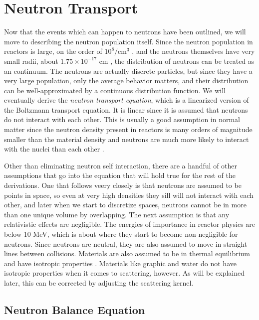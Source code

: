 \section{Neutron Transport}

Now that the events which can happen to neutrons have been outlined, we will move to describing the neutron population itself.  Since the neutron population in reactors is large, on the order of $10^{8}/\mathrm{cm}^3$ \cite{duderstadt}, and the neutrons themselves have very small radii, about $1.75\times10^{-17}$ cm \cite{krane}, the distribution of neutrons can be treated as an continuum.  The neutrons are actually discrete particles, but since they have a very large population, only the average behavior matters, and their distribution can be well-approximated by a continuous distribution function.  We will eventually derive the \emph{neutron transport equation}, which is a linearized version of the Boltzmann transport equation.  It is linear since it is assumed that neutrons do not interact with each other.  This is usually a good assumption in normal matter since the neutron density present in reactors is many orders of magnitude smaller than the material density and neutrons are much more likely to interact with the nuclei than each other \cite{duderstadt}.  

Other than eliminating neutron self interaction, there are a handful of other assumptions that go into the equation that will hold true for the rest of the derivations.  One that follows veery closely is that neutrons are assumed to be points in space, so even at very high densities they sill will not interact with each other, and later when we start to discretize spaces, neutrons cannot be in more than one unique volume by overlapping.  The next assumption is that any relativistic effects are negligible.  The energies of importance in reactor physics are below 10 MeV, which is about where they start to become non-negligible for neutrons.  Since neutrons are neutral, they are also assumed to move in straight lines between collisions.  Materials are also assumed to be in thermal equilibrium and have isotropic properties \cite{duderstadt}.  Materials like graphic and water do not have isotropic properties when it comes to scattering, however.  As will be explained later, this can be corrected by adjusting the scattering kernel.

\subsection{Neutron Balance Equation}


